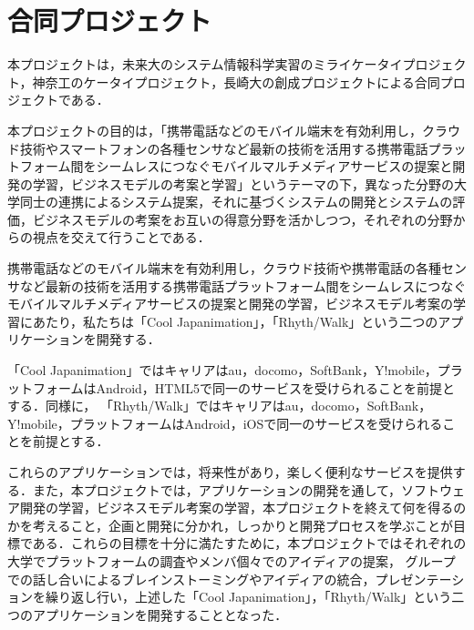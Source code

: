 \section{合同プロジェクト}
本プロジェクトは，未来大のシステム情報科学実習のミライケータイプロジェクト，神奈工のケータイプロジェクト，長崎大の創成プロジェクトによる合同プロジェクトである．
\par
本プロジェクトの目的は，「携帯電話などのモバイル端末を有効利用し，クラウド技術やスマートフォンの各種センサなど最新の技術を活用する携帯電話プラットフォーム間をシームレスにつなぐモバイルマルチメディアサービスの提案と開発の学習，ビジネスモデルの考案と学習」というテーマの下，異なった分野の大学同士の連携によるシステム提案，それに基づくシステムの開発とシステムの評価，ビジネスモデルの考案をお互いの得意分野を活かしつつ，それぞれの分野からの視点を交えて行うことである．
\par
携帯電話などのモバイル端末を有効利用し，クラウド技術や携帯電話の各種センサなど最新の技術を活用する携帯電話プラットフォーム間をシームレスにつなぐモバイルマルチメディアサービスの提案と開発の学習，ビジネスモデル考案の学習にあたり，私たちは「Cool Japanimation」，「Rhyth/Walk」という二つのアプリケーションを開発する．
\par
「Cool Japanimation」ではキャリアはau，docomo，SoftBank，Y!mobile，プラットフォームはAndroid，HTML5で同一のサービスを受けられることを前提とする．同様に，
「Rhyth/Walk」ではキャリアはau，docomo，SoftBank，Y!mobile，プラットフォームはAndroid，iOSで同一のサービスを受けられることを前提とする．
\par
これらのアプリケーションでは，将来性があり，楽しく便利なサービスを提供する．また，本プロジェクトでは，アプリケーションの開発を通して，ソフトウェア開発の学習，ビジネスモデル考案の学習，本プロジェクトを終えて何を得るのかを考えること，企画と開発に分かれ，しっかりと開発プロセスを学ぶことが目標である．これらの目標を十分に満たすために，本プロジェクトではそれぞれの大学でプラットフォームの調査やメンバ個々でのアイディアの提案， グループでの話し合いによるブレインストーミングやアイディアの統合，プレゼンテーションを繰り返し行い，上述した「Cool Japanimation」，「Rhyth/Walk」という二つのアプリケーションを開発することとなった．
